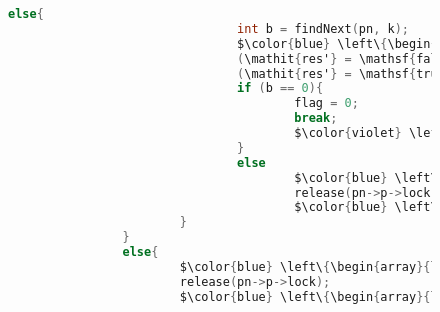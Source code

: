 \documentclass[a4paper,UKenglish,cleveref, autoref, thm-restate]{lipics-v2021}
\newcommand{\infp}{\ensuremath{\mathsf{InFP}}}
\begin{document}
\begin{figure}[!ht]
\begin{lstlisting}[language = C, style=myStyle, mathescape=true]
						else{
								int b = findNext(pn, k);
								$\color{blue} \left\{\begin{array}{l} \exists \  \texttt{n'}. \ \texttt{pn} \mapsto (\texttt{n, n}) \ast \texttt{n->t} \neq \texttt{NULL} \ast \\ 
								(\mathit{res'} = \mathsf{false} \ast \texttt{n'} = \texttt{n} \ast  \infp (\texttt{n}) \ast \mathsf{R}(\texttt{n}) \ast \cdots )\  \lor \\ 
								(\mathit{res'} = \mathsf{true}  \ast \texttt{pn} \mapsto (\texttt{n, n}) \ast \infp (\texttt{n}) \ast \mathsf{R}(\texttt{n}) \ast \texttt{n->t} \mapsto \texttt{n'} \ast \infp (\texttt{n'}) \ast \cdots)   \end{array}\right\}$
								if (b == 0){
										flag = 0;
										break;
										$\color{violet} \left\{\begin{array}{l} \mathit{res} = \mathsf{false} \ast \texttt{pn} \mapsto (\texttt{n, n}) \ast \texttt{n->t} \neq \texttt{NULL}  \ast \texttt{n'} = \texttt{n} \ast  \infp (\texttt{n}) \ast \mathsf{R}(\texttt{n}) \ast \texttt{k} \in \mathsf{range}(\texttt{n}) \ast \cdots   \end{array}\right\}$
								}
								else
										$\color{blue} \left\{\begin{array}{l} \mathit{res'} = \mathsf{true}  \ast \texttt{pn} \mapsto (\texttt{n, n}) \ast \infp (\texttt{n}) \ast \mathsf{R}(\texttt{n}) \ast \texttt{n->t} \mapsto \texttt{n'} \ast \texttt{n->t} \neq \texttt{NULL} \ast \infp (\texttt{n'}) \ast \cdots    \end{array}\right\}$
										release(pn->p->lock);
										$\color{blue} \left\{\begin{array}{l} \mathit{res'} = \mathsf{true}  \ast \texttt{pn} \mapsto (\texttt{n, n}) \ast \infp (\texttt{n}) \ast \texttt{n->t} \mapsto \texttt{n'} \ast \texttt{n->t} \neq \texttt{NULL} \ast \infp (\texttt{n'}) \ast \cdots    \end{array}\right\}$
						}
				}
				else{
						$\color{blue} \left\{\begin{array}{l} \texttt{k} \not\in \mathsf{range}(\texttt{n}) \ast \mathit{res} = \mathsf{true} \ast  \texttt{pn} \mapsto (\texttt{n, n}) \ast \infp (\texttt{n}) \ast \mathsf{R}(\texttt{n}) \ast  \cdots \end{array}\right\}$
						release(pn->p->lock);
						$\color{blue} \left\{\begin{array}{l} \texttt{k} \not\in \mathsf{range}(\texttt{n}) \ast \mathit{res} = \mathsf{true} \ast  \texttt{pn} \mapsto (\texttt{n, n}) \ast \infp (\texttt{n}) \ast  \cdots \end{array}\right\}$

\end{lstlisting}
\end{figure}
\end{document}
